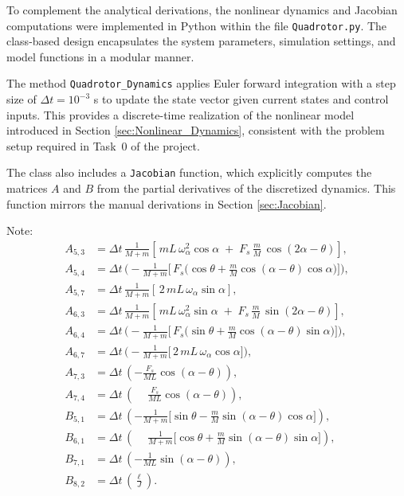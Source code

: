 \documentclass[a4paper,11pt,oneside]{book}
\begin{document}
\begin{justify}
    
    To complement the analytical derivations, the nonlinear dynamics and Jacobian computations were implemented in Python within the file \texttt{Quadrotor.py}. The class-based design encapsulates the system parameters, simulation settings, and model functions in a modular manner. 
    
    The method \texttt{Quadrotor\_Dynamics} applies Euler forward integration with a step size of $\Delta t = 10^{-3}$ s to update the state vector given current states and control inputs. This provides a discrete-time realization of the nonlinear model introduced in Section \ref{sec:Nonlinear_Dynamics}, consistent with the problem setup required in Task~0 of the project.
    
    The class also includes a \texttt{Jacobian} function, which explicitly computes the matrices $A$ and $B$ from the partial derivatives of the discretized dynamics. This function mirrors the manual derivations in Section \ref{sec:Jacobian}.

\end{justify}

Note:
\begin{align}
A_{5,3} &= \Delta t\,\frac{1}{M+m}\!\left[\,mL\,\omega_\alpha^2 \cos\alpha \;+\; F_s\,\frac{m}{M}\,\cos(2\alpha-\theta)\right],\\
A_{5,4} &= \Delta t\,\Bigg(-\frac{1}{M+m}\Big[\,F_s\big(\cos\theta + \tfrac{m}{M}\cos(\alpha-\theta)\cos\alpha\big)\Big]\Bigg),\\
A_{5,7} &= \Delta t\,\frac{1}{M+m}\left[\,2\,mL\,\omega_\alpha \sin\alpha \right],\\[4pt]
A_{6,3} &= \Delta t\,\frac{1}{M+m}\!\left[\,mL\,\omega_\alpha^2 \sin\alpha \;+\; F_s\,\frac{m}{M}\,\sin(2\alpha-\theta)\right],\\
A_{6,4} &= \Delta t\,\Bigg(-\frac{1}{M+m}\Big[\,F_s\big(\sin\theta + \tfrac{m}{M}\cos(\alpha-\theta)\sin\alpha\big)\Big]\Bigg),\\
A_{6,7} &= \Delta t\,\Bigg(-\frac{1}{M+m}\Big[\,2\,mL\,\omega_\alpha \cos\alpha \Big]\Bigg),\\
A_{7,3} &= \Delta t\,\left(-\frac{F_s}{ML}\cos(\alpha-\theta)\right),\qquad \\
A_{7,4} &= \Delta t\,\left(\phantom{-}\frac{F_s}{ML}\cos(\alpha-\theta)\right), \\
B_{5,1} &= \Delta t\,\left(-\frac{1}{M+m}\Big[\sin\theta - \tfrac{m}{M}\sin(\alpha-\theta)\cos\alpha\Big]\right),\\
B_{6,1} &= \Delta t\,\left(\phantom{-}\frac{1}{M+m}\Big[\cos\theta + \tfrac{m}{M}\sin(\alpha-\theta)\sin\alpha\Big]\right),\\
B_{7,1} &= \Delta t\,\left(-\frac{1}{ML}\sin(\alpha-\theta)\right),\\
B_{8,2} &= \Delta t\,\left(\frac{\ell}{J}\right).
\end{align}
\end{document}
